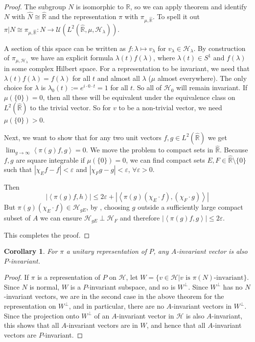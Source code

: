 \documentclass[
  12pt
]{article}
\numberwithin{equation}{section}
\newtheorem{cor}[thm]{Corollary}
\theoremstyle{plain}
\newtheorem*{proof}{Proof}
\newcommand{\mpi}{\ensuremath{\pi}\xspace}
\newcommand{\bbr}{\ensuremath{\mathbb{R}}\xspace}
\newcommand{\hilb}{\ensuremath{\mathscr{H}}\xspace}
\newcommand{\abs}[1]{| #1 |}
\newcommand{\inn}[1]{\left\langle #1 \right\rangle}
\begin{document}
  \begin{proof}
    The subgroup $N$ is isomorphic to \bbr, so we can apply theorem 
    and identify $N$ with $\hat{N} \cong \hat{\bbr}$ and the representation \mpi with $\pi_{\mu, \hat{\bbr}}$.
    To spell it out $\pi|N \cong \pi_{\mu, \hat{\bbr}}: N \rightarrow \mathcal{U}(L^2(\hat{\bbr}, \mu, \hilb_{\lambda}))$.

    A section of this space can be written as $f: \lambda \mapsto v_{\lambda}$ for $v_{\lambda} \in \hilb_{\lambda}$.
    By construction of $\pi_{\mu, \hilb_{\lambda}}$ we have an explicit
    formula $\lambda(t)f(\lambda)$, where $\lambda(t) \in S^1$ and $f(\lambda)$ in some complex Hilbert space.
    For a representation to be invariant, we need that $\lambda(t)f(\lambda) = f(\lambda)$ for all $t$ and almost all $\lambda$ ($\mu$ almost everywhere).
    The only choice for $\lambda$ is $\lambda_0(t) := e^{i \cdot 0 \cdot t} = 1$ for all $t$.
    So all of $\hilb_0$ will remain invariant.
    If $\mu(\{0\}) = 0$, then all these will be equivalent under the equivalence class on $L^2(\hat{\bbr})$ to the trivial vector.
    So for $v$ to be a non-trivial vector, we need $\mu(\{0\}) > 0$.

    Next, we want to show that for any two unit vectors $f, g \in L^2(\hat{\bbr})$ we get $\lim_{g\to\infty} \inn{\pi(g)f,g} = 0$.
    We move the problem to compact sets in $\hat{\bbr}$.
    Because $f,g$ are square integrable if $\mu(\{0\})=0$, we can find
    compact sets $E, F \in \hat{\bbr}\setminus \{0\}$ such that $\abs{\chi_Ef -
    f} < \varepsilon$ and $\abs{\chi_Fg -g} < \varepsilon$, $\forall
    \varepsilon > 0$.

    Then
    $$
    \abs{\inn{\pi(g)f, h}} \leq 2\varepsilon + \abs{\inn{\pi(g)(\chi_E\cdot f), (\chi_F \cdot g)}}
    $$
    But $\pi(g)(\chi_E\cdot f) \in \hilb_{gE}$, by , choosing $g$ outside a sufficiently large compact subset of $A$ we can ensure $\hilb_{gE}\perp \hilb_{F}$ and therefore $\abs{\inn{\pi(g)f, g}} \leq 2\varepsilon$.

    This completes the proof.
  \end{proof}

  \begin{cor}
    \label{cor:2.3.7}
    For \mpi a unitary representation of $P$, any $A$-invariant vector is also $P$-invariant.
  \end{cor}

  \begin{proof}
    If \mpi is a representation of $P$ on \hilb, let $W=\{v \in \hilb|v \text{ is } \pi(N)\text{-invariant}\}$.
    Since $N$ is normal, $W$ is a $P$-invariant subspace, and so is $W^{\perp}$. 
    Since $W^{\perp}$ has no $N$-invariant vectors, we are in the second case
    in the above theorem for the representation on $W^{\perp}$, and in
    particular, there are no $A$-invariant vectors in $W^{\perp}$. Since the
    projection onto $W^{\perp}$ of an $A$-invariant vector in \hilb is also
    $A$-invariant, this shows that all $A$-invariant vectors are in $W$, and
    hence that all $A$-invariant vectors are $P$-invariant.
  \end{proof}
\end{document}
